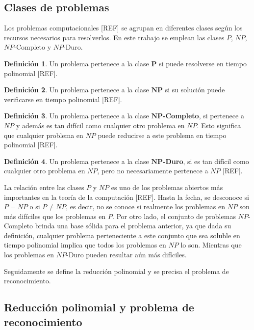 \documentclass{report}
\theoremstyle{definition}
\newtheorem{definicion}{Definición}[chapter]
\theoremstyle{plain}
\theoremstyle{remark}
\begin{document}
\subsection{Clases de problemas}

Los problemas computacionales [REF] se agrupan en diferentes
clases según los recursos necesarios para resolverlos. En este trabajo se
emplean las clases $P$, $NP$, $NP$-Completo y $NP$-Duro.

\begin{definicion}
Un problema pertenece a la clase $\boldsymbol{P}$ si puede resolverse en
tiempo polinomial [REF].
\end{definicion}

\begin{definicion}
Un problema pertenece a la clase $\boldsymbol{NP}$ si su solución puede
verificarse en tiempo polinomial [REF].
\end{definicion}

\begin{definicion}
Un problema pertenece a la clase $\boldsymbol{NP}$\textbf{-Completo}, si
pertenece a $NP$ y además es tan difícil como cualquier otro problema en
$NP$. Esto significa que cualquier problema en $NP$ puede reducirse a
este problema en tiempo polinomial [REF].
\end{definicion}

\begin{definicion}
Un problema pertenece a la clase $\boldsymbol{NP}$\textbf{-Duro}, si es
tan difícil como cualquier otro problema en $NP$, pero no necesariamente
pertenece a $NP$ [REF].
\end{definicion}

La relación entre las clases $P$ y $NP$ es uno de los problemas abiertos
más importantes en la teoría de la computación [REF]. Hasta la
fecha, se desconoce si $P = NP$ o si $P \neq NP$, es decir, no se conoce
si realmente los problemas en $NP$ son más difíciles que los problemas
en $P$. Por otro lado, el conjunto de problemas $NP$-Completo brinda una
base sólida para el problema anterior, ya que dada su definición,
cualquier problema perteneciente a este conjunto que sea soluble en
tiempo polinomial implica que todos los problemas en $NP$ lo son.
Mientras que los problemas en $NP$-Duro pueden resultar aún más difíciles.

Seguidamente se define la reducción polinomial y se precisa el problema
de reconocimiento.

\subsection{Reducción polinomial y problema de reconocimiento}
\end{document}

